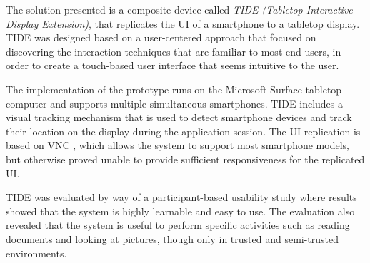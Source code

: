 The solution presented is a composite device called \emph{TIDE (Tabletop Interactive Display Extension)}, that replicates the UI of a smartphone to a tabletop display.
TIDE was designed based on a user-centered approach that focused on discovering the interaction techniques that are familiar to most end users, in order to create a touch-based user interface that seems intuitive to the user.

The implementation of the prototype runs on the Microsoft Surface tabletop computer and supports multiple simultaneous smartphones.
TIDE includes a visual tracking mechanism that is used to detect smartphone devices and track their location on the display during the application session.
The UI replication is based on VNC \citep{Richardson:1998:vnc}, which allows the system to support most smartphone models, but otherwise proved unable to provide sufficient responsiveness for the replicated UI.

TIDE was evaluated by way of a participant-based usability study where results showed that the system is highly learnable and easy to use.
The evaluation also revealed that the system is useful to perform specific activities such as reading documents and looking at pictures, though only in trusted and semi-trusted environments.



